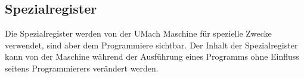 \subsection{Spezialregister}
Die Spezialregister werden von der UMach Maschine für spezielle Zwecke
verwendet, sind aber dem Programmiere sichtbar. Der Inhalt der Spezialregister
kann von der Maschine während der Ausführung eines Programms ohne Einfluss
seitens Programmierers verändert werden.

